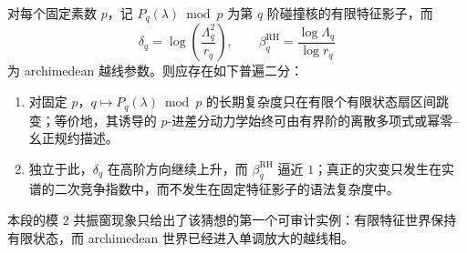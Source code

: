 \begin{conjecture}\label{conj:conclusion-fixed-characteristic-shadow-archimedean-splitting}
对每个固定素数 \(p\)，记 \(P_q(\lambda)\bmod p\) 为第 \(q\) 阶碰撞核的有限特征影子，而
\[
\delta_q=\log\!\left(\frac{\Lambda_q^2}{r_q}\right),
\qquad
\beta_q^{\mathrm{RH}}=\frac{\log\Lambda_q}{\log r_q}
\]
为 archimedean 越线参数。则应存在如下普遍二分：
\begin{enumerate}
  \item 对固定 \(p\)，\(q\mapsto P_q(\lambda)\bmod p\) 的长期复杂度只在有限个有限状态扇区间跳变；等价地，其诱导的 \(p\)-进差分动力学始终可由有界阶的离散多项式或幂零--幺正规约描述。
  \item 独立于此，\(\delta_q\) 在高阶方向继续上升，而 \(\beta_q^{\mathrm{RH}}\) 逼近 \(1\)；真正的灾变只发生在实谱的二次竞争指数中，而不发生在固定特征影子的语法复杂度中。
\end{enumerate}
本段的模 \(2\) 共振窗现象只给出了该猜想的第一个可审计实例：有限特征世界保持有限状态，而 archimedean 世界已经进入单调放大的越线相。
\end{conjecture}

